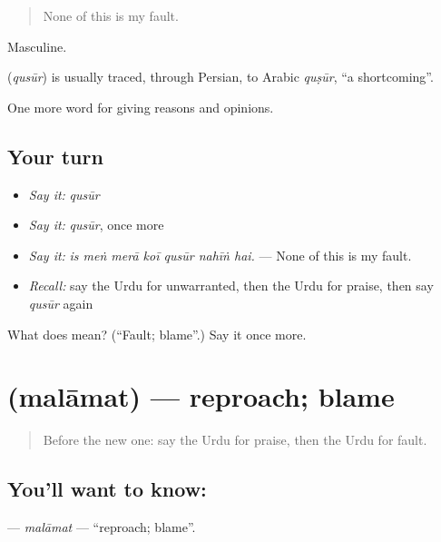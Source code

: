 \begin{quote}
None of this is my fault.
\end{quote}

Masculine.

\begin{cousinweb}
\textbf{} (\emph{qusūr}) is usually traced, through Persian, to Arabic \emph{quṣūr}, \textquotedblleft{}a shortcoming\textquotedblright{}.
\end{cousinweb}

\begin{grammarlens}[title={What you've built}]
One more word for giving reasons and opinions.
\end{grammarlens}

\subsection*{Your turn}
\begin{itemize}
\raggedright
  \item \emph{Say it:} \emph{qusūr}
  \item \emph{Say it:} \emph{qusūr}, once more
  \item \emph{Say it:} \emph{is meṅ merā koī qusūr nahīṅ hai.} — None of this is my fault.
  \item \emph{Recall:} say the Urdu for unwarranted, then the Urdu for praise, then say \emph{qusūr} again
\end{itemize}

\begin{tcolorbox}[breakable,colback=teal!4,colframe=teal!35!black,title={Before you move on}]
What does  mean? (\textquotedblleft{}Fault; blame\textquotedblright{}.) Say it once more.
\end{tcolorbox}
\section[\texorpdfstring{\ur{ملامت} (malāmat)}{ملامت (malāmat)}]{ (malāmat) — reproach; blame}

\label{lesson:UR-C355-malamat}



\begin{quote}
Before the new one: say the Urdu for praise, then the Urdu for fault.
\end{quote}

\subsection*{You'll want to know: }
\textbf{} — \emph{malāmat} — \textquotedblleft{}reproach; blame\textquotedblright{}.

